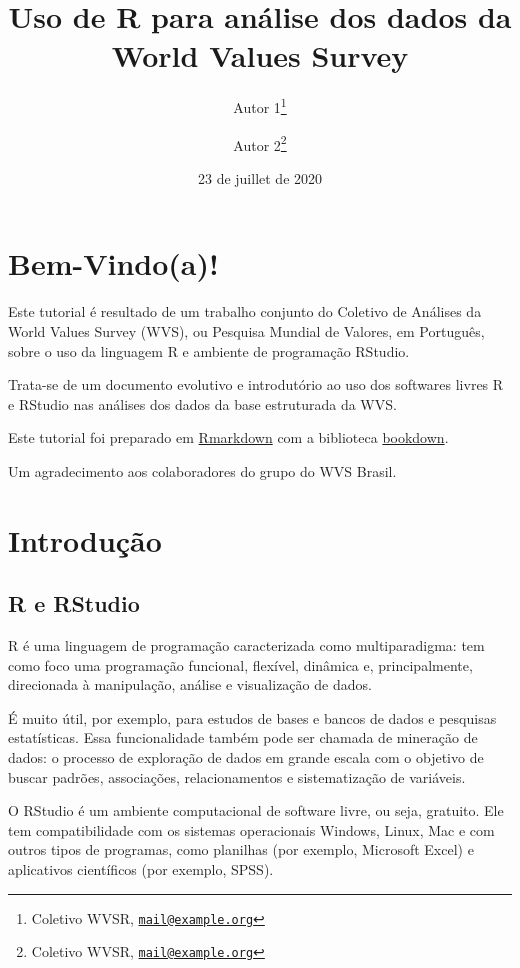 \documentclass[
  10pt,
  brazil,
  a4paper,
  twoside, notitlepage, openright]{book}
\title{Uso de R para análise dos dados da World Values Survey}
\author{Autor 1\footnote{Coletivo WVSR, \href{mailto:mail@example.org}{\nolinkurl{mail@example.org}}} \and Autor 2\footnote{Coletivo WVSR, \href{mailto:mail@example.org}{\nolinkurl{mail@example.org}}}}
\date{23 de juillet de 2020}
\begin{document}
\maketitle

{
\setcounter{tocdepth}{1}
\tableofcontents
}
\hypertarget{bem-vindoa}{%
\chapter*{Bem-Vindo(a)!}\label{bem-vindoa}}

Este tutorial é resultado de um trabalho conjunto do Coletivo de Análises da World Values Survey (WVS), ou Pesquisa Mundial de Valores, em Português, sobre o uso da linguagem R e ambiente de programação RStudio.

Trata-se de um documento evolutivo e introdutório ao uso dos softwares livres R e RStudio nas análises dos dados da base estruturada da WVS.

Este tutorial foi preparado em \href{https://rmarkdown.rstudio.com/}{Rmarkdown} com a biblioteca \href{https://bookdown.org/}{bookdown}.

Um agradecimento aos colaboradores do grupo do WVS Brasil.

\hypertarget{intro}{%
\chapter{Introdução}\label{intro}}

\hypertarget{r-e-rstudio}{%
\section{R e RStudio}\label{r-e-rstudio}}

R é uma linguagem de programação caracterizada como multiparadigma: tem como foco uma programação funcional, flexível, dinâmica e, principalmente, direcionada à manipulação, análise e visualização de dados.

É muito útil, por exemplo, para estudos de bases e bancos de dados e pesquisas estatísticas. Essa funcionalidade também pode ser chamada de mineração de dados: o processo de exploração de dados em grande escala com o objetivo de buscar padrões, associações, relacionamentos e sistematização de variáveis.

O RStudio é um ambiente computacional de software livre, ou seja, gratuito. Ele tem compatibilidade com os sistemas operacionais Windows, Linux, Mac e com outros tipos de programas, como planilhas (por exemplo, Microsoft Excel) e aplicativos científicos (por exemplo, SPSS).
\end{document}
